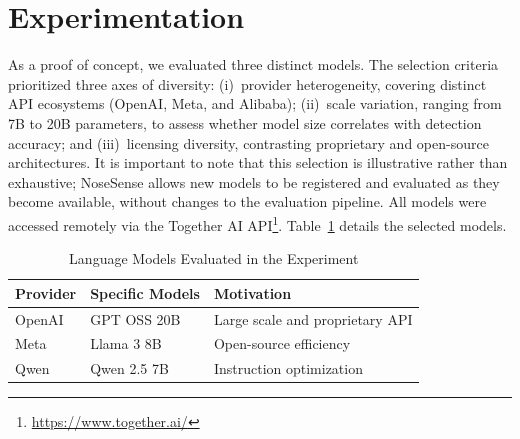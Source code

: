 \documentclass[sigconf]{acmart}
\begin{document}
\section{Experimentation}
\label{sec:experimentacao}

As a proof of concept, we evaluated three distinct models. The selection criteria prioritized three axes of diversity: (i)~provider heterogeneity, covering distinct API ecosystems (OpenAI, Meta, and Alibaba); (ii)~scale variation, ranging from 7B to 20B parameters, to assess whether model size correlates with detection accuracy; and (iii)~licensing diversity, contrasting proprietary and open-source architectures. It is important to note that this selection is illustrative rather than exhaustive; NoseSense allows new models to be registered and evaluated as they become available, without changes to the evaluation pipeline. All models were accessed remotely via the Together AI API\footnote{\url{https://www.together.ai/}}. Table~\ref{tab:models_evaluated} details the selected models.

\begin{table}[htb]
    \centering
    \caption{Language Models Evaluated in the Experiment}
    \label{tab:models_evaluated}
    \renewcommand{\arraystretch}{1.2}
    \footnotesize
    \begin{tabular}{lll}
        \toprule
        \textbf{Provider} & \textbf{Specific Models} & \textbf{Motivation} \\
        \midrule
        OpenAI & GPT OSS 20B & Large scale and proprietary API \\
        Meta   & Llama 3 8B  & Open-source efficiency \\
        Qwen   & Qwen 2.5 7B & Instruction optimization \\
        \bottomrule
    \end{tabular}
    \vspace{-10px}
\end{table}

\end{document}
